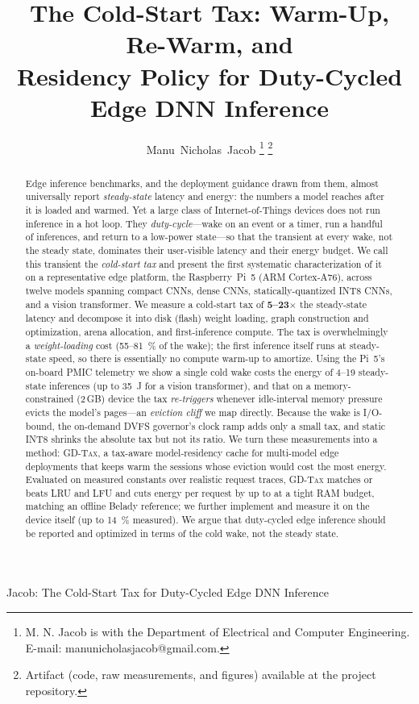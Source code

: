 \documentclass[journal]{IEEEtran}
\newcommand{\gdtax}{\textsc{GD-Tax}}
\begin{document}
\title{The Cold-Start Tax: Warm-Up, Re-Warm, and\\ Residency Policy for Duty-Cycled Edge DNN Inference}

\author{Manu~Nicholas~Jacob%
\thanks{M. N. Jacob is with the Department of Electrical and Computer Engineering.
E-mail: manunicholasjacob@gmail.com.}%
\thanks{Artifact (code, raw measurements, and figures) available at the project repository.}}

%
{Jacob: The Cold-Start Tax for Duty-Cycled Edge DNN Inference}

\maketitle

\begin{abstract}
Edge inference benchmarks, and the deployment guidance drawn from them, almost universally
report \emph{steady-state} latency and energy: the numbers a model reaches after it is loaded
and warmed. Yet a large class of Internet-of-Things devices does not run inference in a hot
loop. They \emph{duty-cycle}---wake on an event or a timer, run a handful of inferences, and
return to a low-power state---so that the transient at every wake, not the steady state,
dominates their user-visible latency and their energy budget. We call this transient the
\emph{cold-start tax} and present the first systematic characterization of it on a
representative edge platform, the Raspberry~Pi~5 (ARM Cortex-A76), across twelve models
spanning compact CNNs, dense CNNs, statically-quantized INT8 CNNs, and a vision transformer.
We measure a cold-start tax of \textbf{5--23$\times$} the steady-state latency and decompose it
into disk (flash) weight loading, graph construction and optimization, arena allocation, and
first-inference compute. The tax is overwhelmingly a \emph{weight-loading} cost
(\num{55}--\SI{81}{\percent} of the wake); the first inference itself runs at steady-state
speed, so there is essentially no compute warm-up to amortize. Using the Pi~5's on-board PMIC
telemetry we show a single cold wake costs the energy of 4--19 steady-state inferences (up to
\SI{35}{J} for a vision transformer), and that on a memory-constrained (2\,GB) device the tax
\emph{re-triggers} whenever
idle-interval memory pressure evicts the model's pages---an \emph{eviction cliff} we map
directly. Because the wake is I/O-bound, the on-demand DVFS governor's clock ramp adds only a
small tax, and static INT8 shrinks the absolute tax but not its ratio. We turn these
measurements into a method: \gdtax{}, a tax-aware model-residency cache for multi-model edge
deployments that keeps warm the sessions whose eviction would cost the most energy. Evaluated on
measured constants over realistic request traces, \gdtax{} matches or beats LRU and LFU and
cuts energy per request by up to \ABSPOLICYSAVE{} at a tight RAM budget, matching an offline
Belady reference; we further implement and measure it on the device itself (up to \SI{14}{\percent}
measured). We argue that
duty-cycled edge inference should be reported and optimized in terms of the cold wake, not the
steady state.
\end{abstract}
\end{document}
